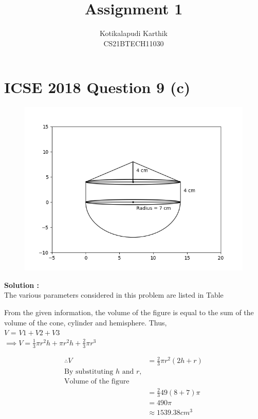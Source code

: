 \documentclass[journal,12pt,twocolumn]{IEEEtran}
\title{Assignment 1}
\author{Kotikalapudi Karthik \\
CS21BTECH11030}
\begin{document}
\maketitle

\section*{ICSE 2018 Question 9 (c)}
\begin{figure}[ht!]
	  \centering 
	  \includegraphics[width=\columnwidth]{Figs/question9c.png}
\end{figure}
\textbf{Solution :}\\
The various parameters considered in this problem are listed in Table
\begin{table}[ht!]
    \centering
    
\end{table}

From the given information, the volume of the figure is equal to the sum of the volume of the cone, cylinder and hemisphere. Thus,\\
$V$ = $V1 + V2 + V3$\\
$\implies V = \frac{1}{3} \pi r^2 h + \pi r^2 h + \frac{2}{3} \pi r^3$

\begin{align*}
    \therefore V&= \frac{2}{3} \pi r^2 (2h+r)\\
    \text{By substituting $h$ and $r$,}\\
    \text{Volume of the figure}\\
    &= \frac{2}{3} 49 (8+7) \pi\\
    &= 490 \pi\\ 
    &\approx 1539.38cm^3
\end{align*}
\end{document}
